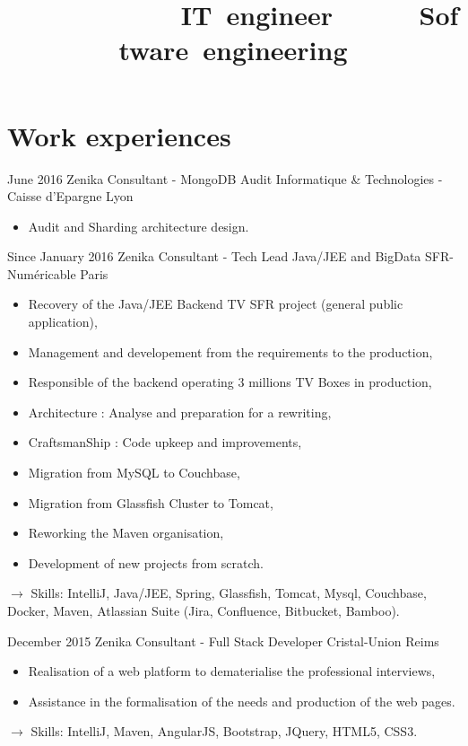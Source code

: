 \documentclass[11pt,a4paper]{moderncv}
\title{\mbox{~~~~~~~~~~~~IT engineer}\newline\mbox{~~~~~~Software engineering}} %
\begin{document}
\maketitle

\section{Work experiences}

\cventry
{June 2016}
{Zenika Consultant - MongoDB Audit}
{Informatique \& Technologies - Caisse d'Epargne}
{Lyon}
{}
{\begin{itemize}
\item Audit and Sharding architecture design.
\end{itemize}
}   %

\cventry
{Since January 2016}
{Zenika Consultant - Tech Lead Java/JEE and BigData}
{SFR-Numéricable}
{Paris}
{}
{\begin{itemize}
\item Recovery of the Java/JEE Backend TV SFR project (general public application),
\item Management and developement from the requirements to the production,
\item Responsible of the backend operating 3 millions TV Boxes in production,
\item Architecture : Analyse and preparation for a rewriting,
\item CraftsmanShip : Code upkeep and improvements,
\item Migration from MySQL to Couchbase,
\item Migration from Glassfish Cluster to Tomcat,
\item Reworking the Maven organisation,
\item Development of new projects from scratch.
\end{itemize}
$\rightarrow$ Skills: IntelliJ, Java/JEE, Spring, Glassfish, Tomcat, Mysql, Couchbase, Docker, Maven, Atlassian Suite (Jira, Confluence, Bitbucket, Bamboo).
}   %

\cventry
{December 2015}
{Zenika Consultant - Full Stack Developer}
{Cristal-Union}
{Reims}
{}
{\begin{itemize}
\item Realisation of a web platform to dematerialise the professional interviews,
\item Assistance in the formalisation of the needs and production of the web pages.
\end{itemize}
$\rightarrow$ Skills: IntelliJ, Maven, AngularJS, Bootstrap, JQuery, HTML5, CSS3.
}   %
\end{document}
